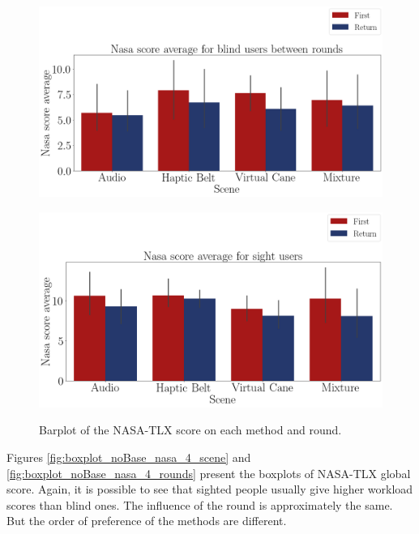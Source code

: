 \begin{figure}[!htb]
    \centering
    \begin{minipage}{\textwidth}
        \centering
        \includegraphics[width = 0.8\linewidth]{Resultados/Nasa/Figuras/png/barplot_nasa_avg_4_scene_blind.png}
        \label{fig:barplot_nasa_avg_4_scene_blind}
    \end{minipage}
    \begin{minipage}{\textwidth}
        \centering
        \includegraphics[width = 0.8\linewidth]{Resultados/Nasa/Figuras/png/barplot_nasa_avg_4_scene_sight.png}
        \label{fig:barplot_nasa_avg_4_scene_sight}
    \end{minipage}
    \caption{Barplot of the NASA-TLX score on each method and round.}
    \label{fig:barplot_nasa_avg_4_scene}
\end{figure}

Figures \ref{fig:boxplot_noBase_nasa_4_scene} and \ref{fig:boxplot_noBase_nasa_4_rounds} present the boxplots of NASA-TLX global score. Again, it is possible to see that sighted people usually give higher workload scores than blind ones. The influence of the round is approximately the same. But the order of preference of the methods are different.

